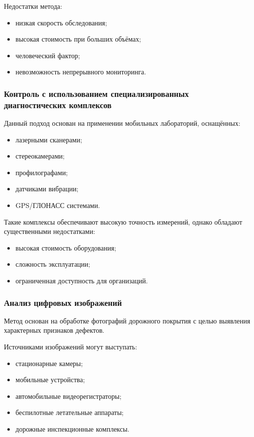 Недостатки метода:

\begin{itemize}
	\item низкая скорость обследования;
	\item высокая стоимость при больших объёмах;
	\item человеческий фактор;
	\item невозможность непрерывного мониторинга.
\end{itemize}

\subsubsection{Контроль с использованием специализированных диагностических комплексов}

Данный подход основан на применении мобильных лабораторий, оснащённых:

\begin{itemize}
	\item лазерными сканерами;
	\item стереокамерами;
	\item профилографами;
	\item датчиками вибрации;
	\item GPS/ГЛОНАСС системами.
\end{itemize}

Такие комплексы обеспечивают высокую точность измерений, однако обладают существенными недостатками:

\begin{itemize}
	\item высокая стоимость оборудования;
	\item сложность эксплуатации;
	\item ограниченная доступность для организаций.
\end{itemize}

\subsubsection{Анализ цифровых изображений}

Метод основан на обработке фотографий дорожного покрытия с целью выявления характерных признаков дефектов.

Источниками изображений могут выступать:

\begin{itemize}
	\item стационарные камеры;
	\item мобильные устройства;
	\item автомобильные видеорегистраторы;
	\item беспилотные летательные аппараты;
	\item дорожные инспекционные комплексы.
\end{itemize}

